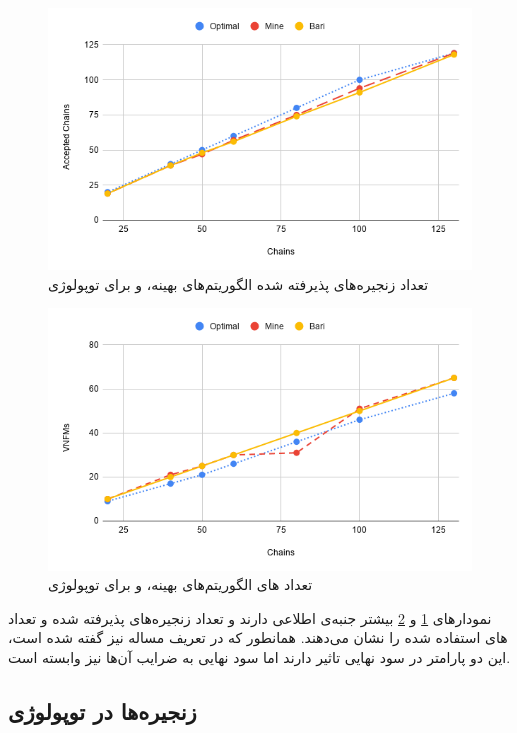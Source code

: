 \begin{figure}[h!]
\center\includegraphics[scale=.5]{images/chart-3}
\caption{تعداد زنجیره‌های پذیرفته شده الگوریتم‌های بهینه،  و  برای توپولوژی }
\label{fig.8}
\end{figure}

\begin{figure}[h!]
\center\includegraphics[scale=.5]{images/chart-4}
\caption{تعداد های الگوریتم‌های بهینه،  و  برای توپولوژی }
\label{fig.9}
\end{figure}

نمودارهای \ref{fig.8} و \ref{fig.9}
بیشتر جنبه‌ی اطلاعی دارند و تعداد زنجیره‌های پذیرفته شده و تعداد
های
استفاده شده را نشان می‌دهند.
همانطور که در تعریف مساله نیز گفته شده است، این دو پارامتر در سود نهایی تاثیر دارند
اما سود نهایی به ضرایب آن‌ها نیز وابسته است.

\subsection{زنجیره‌ها در توپولوژی }

